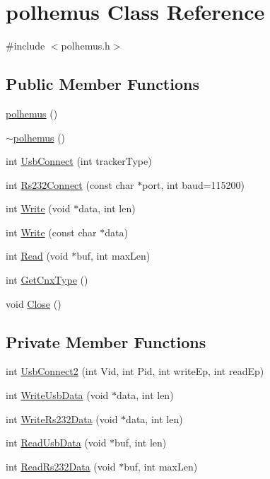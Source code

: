 \hypertarget{classpolhemus}{\section{polhemus Class Reference}
\label{classpolhemus}
}


{\ttfamily \#include $<$polhemus.\-h$>$}

\subsection*{Public Member Functions}
\begin{DoxyCompactItemize}
\item 
\hyperlink{classpolhemus_ab4132cf8a5470051bfedc3865940fc05}{polhemus} ()
\item 
\hyperlink{classpolhemus_af6df8fdae796fb68057bc8e97b08bc07}{$\sim$polhemus} ()
\item 
int \hyperlink{classpolhemus_a6bede5fcb0fc30e3318f1386786609a3}{Usb\-Connect} (int tracker\-Type)
\item 
int \hyperlink{classpolhemus_a8e9f653dd086ea03c63466b21a57410d}{Rs232\-Connect} (const char $\ast$port, int baud=115200)
\item 
int \hyperlink{classpolhemus_ab52c1f7c52149bd92b710ed45a3df58d}{Write} (void $\ast$data, int len)
\item 
int \hyperlink{classpolhemus_a68175e317d8ebeede61f3e3e03326238}{Write} (const char $\ast$data)
\item 
int \hyperlink{classpolhemus_a2598172e33dece8f559a4d52e35129fd}{Read} (void $\ast$buf, int max\-Len)
\item 
int \hyperlink{classpolhemus_ab80108ab6f3f75a8a177c13b54c5dfcb}{Get\-Cnx\-Type} ()
\item 
void \hyperlink{classpolhemus_ac994cdfa22308e3780521d5358446bde}{Close} ()
\end{DoxyCompactItemize}
\subsection*{Private Member Functions}
\begin{DoxyCompactItemize}
\item 
int \hyperlink{classpolhemus_ae8e52e83ef59b7a283fd0e45e296bb64}{Usb\-Connect2} (int Vid, int Pid, int write\-Ep, int read\-Ep)
\item 
int \hyperlink{classpolhemus_a77f793f69939edd390fd7dc7c47e3fc8}{Write\-Usb\-Data} (void $\ast$data, int len)
\item 
int \hyperlink{classpolhemus_a02379ecbd333b291404e23ec0e6d9e9f}{Write\-Rs232\-Data} (void $\ast$data, int len)
\item 
int \hyperlink{classpolhemus_a7b3888ca5972c98305d794a4c4bb0f46}{Read\-Usb\-Data} (void $\ast$buf, int len)
\item 
int \hyperlink{classpolhemus_a5f6ab4814578ac3fa7bc451bf05ac723}{Read\-Rs232\-Data} (void $\ast$buf, int max\-Len)
\end{DoxyCompactItemize}
